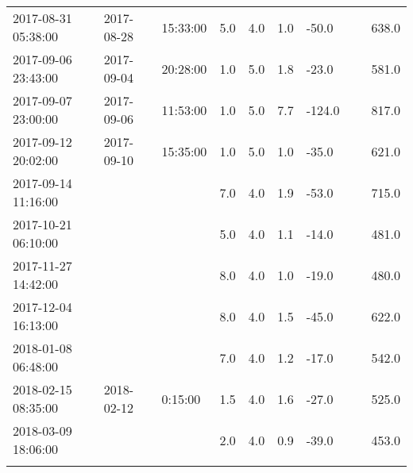 \begin{longtable}{lllllllll}
        2017-08-31 05:38:00 & 2017-08-28 & 15:33:00 & 5.0 & 4.0 & 1.0 & -50.0 & ~ & 638.0 \\ 
        2017-09-06 23:43:00 & 2017-09-04 & 20:28:00 & 1.0 & 5.0 & 1.8 & -23.0 & ~ & 581.0 \\ 
        2017-09-07 23:00:00 & 2017-09-06 & 11:53:00 & 1.0 & 5.0 & 7.7 & -124.0 & ~ & 817.0 \\ 
        2017-09-12 20:02:00 & 2017-09-10 & 15:35:00 & 1.0 & 5.0 & 1.0 & -35.0 & ~ & 621.0 \\ 
        2017-09-14 11:16:00 & ~ & ~ & 7.0 & 4.0 & 1.9 & -53.0 & ~ & 715.0 \\ 
        2017-10-21 06:10:00 & ~ & ~ & 5.0 & 4.0 & 1.1 & -14.0 & ~ & 481.0 \\ 
        2017-11-27 14:42:00 & ~ & ~ & 8.0 & 4.0 & 1.0 & -19.0 & ~ & 480.0 \\ 
        2017-12-04 16:13:00 & ~ & ~ & 8.0 & 4.0 & 1.5 & -45.0 & ~ & 622.0 \\ 
        2018-01-08 06:48:00 & ~ & ~ & 7.0 & 4.0 & 1.2 & -17.0 & ~ & 542.0 \\ 
        2018-02-15 08:35:00 & 2018-02-12 & 0:15:00 & 1.5 & 4.0 & 1.6 & -27.0 & ~ & 525.0 \\ 
        2018-03-09 18:06:00 & ~ & ~ & 2.0 & 4.0 & 0.9 & -39.0 & ~ & 453.0 \\
\bottomrule
\label{tab:my_label}
\end{longtable}
